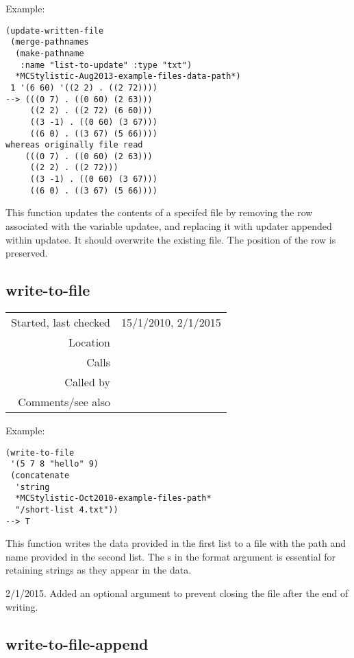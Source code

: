 \vspace{0.5cm}
\noindent Example:
\begin{verbatim}
(update-written-file
 (merge-pathnames
  (make-pathname
   :name "list-to-update" :type "txt")
  *MCStylistic-Aug2013-example-files-data-path*)
 1 '(6 60) '((2 2) . ((2 72))))
--> (((0 7) . ((0 60) (2 63)))
     ((2 2) . ((2 72) (6 60)))
     ((3 -1) . ((0 60) (3 67)))
     ((6 0) . ((3 67) (5 66))))
whereas originally file read
    (((0 7) . ((0 60) (2 63)))
     ((2 2) . ((2 72)))
     ((3 -1) . ((0 60) (3 67)))
     ((6 0) . ((3 67) (5 66))))
\end{verbatim}

\noindent This function updates the contents of a
specifed file by removing the row associated with the
variable updatee, and replacing it with updater
appended within updatee. It should overwrite the
existing file. The position of the row is
preserved.


\subsection*{write-to-file}\label{fun:write-to-file}

\vspace{0.3cm}
\begin{tabular}{r|p{8cm}}
Started, last checked & 15/1/2010, 2/1/2015 \\
Location & \nameref{sec:text-files} \\
Calls & \\
Called by & \nameref{fun:update-written-file} \\
Comments/see also &
\end{tabular}

\vspace{0.5cm}
\noindent Example:
\begin{verbatim}
(write-to-file
 '(5 7 8 "hello" 9)
 (concatenate
  'string
  *MCStylistic-Oct2010-example-files-path*
  "/short-list 4.txt"))
--> T
\end{verbatim}

\noindent This function writes the data provided in
the first list to a file with the path and name
provided in the second list. The s in the format
argument is essential for retaining strings as they
appear in the data.

2/1/2015. Added an optional argument to prevent
closing the file after the end of writing.


\subsection*{write-to-file-append}\label{fun:write-to-file-append}


